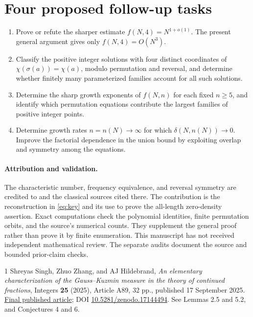 \documentclass[11pt]{article}
\begin{document}
\section*{Four proposed follow-up tasks}
\begin{enumerate}[label=\textbf{Task \arabic*:},start=2,leftmargin=*]
\item Prove or refute the sharper estimate $f(N,4)=N^{1+o(1)}$.
The present general argument gives only $f(N,4)=O(N^3)$.
\item Classify the positive integer solutions with four distinct
coordinates of $\chi(\sigma(a))=\chi(a)$, modulo permutation and
reversal, and determine whether finitely many parameterized families
account for all such solutions.
\item Determine the sharp growth exponents of $f(N,n)$ for each
fixed $n\ge5$, and identify which permutation equations contribute
the largest families of positive integer points.
\item Determine growth rates $n=n(N)\to\infty$ for which
$\delta(N,n(N))\to0$. Improve the factorial dependence in the
union bound by exploiting overlap and symmetry among the equations.
\end{enumerate}

\paragraph{Attribution and validation.}
The characteristic number, frequency equivalence, and reversal
symmetry are credited to \cite{SZH} and the classical sources cited
there. The contribution is the reconstruction in \eqref{eq:key}
and its use to prove the all-length zero-density assertion.
Exact computations check the polynomial identities, finite permutation
orbits, and the source's numerical counts. They supplement the
general proof rather than prove it by finite enumeration.
This manuscript has not received independent mathematical review.
The separate audits document the source and bounded prior-claim checks.

\begin{thebibliography}{1}
 Shreyas Singh, Zhuo Zhang, and AJ Hildebrand,
\emph{An elementary characterization of the Gauss--Kuzmin measure
in the theory of continued fractions}, Integers \textbf{25} (2025),
Article A89, 32 pp., published 17 September 2025.
\href{https://math.colgate.edu/~integers/z89/z89.pdf}{Final published article};
DOI \href{https://doi.org/10.5281/zenodo.17144494}{10.5281/zenodo.17144494}.
See Lemmas 2.5 and 5.2, and Conjectures 4 and 6.
\end{thebibliography}
\end{document}
